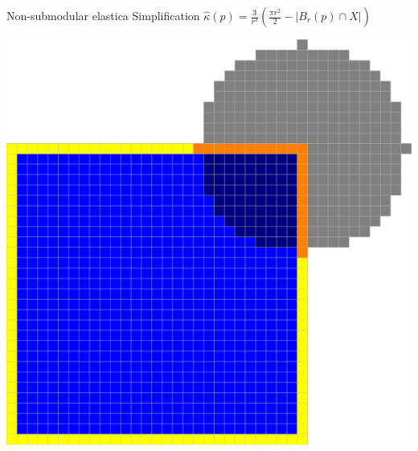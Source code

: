 \begin{frame}
{Non-submodular elastica}
{Simplification}
\center
$\hat{\kappa}(p) = \frac{3}{r^3}\left( \frac{\pi r^2}{2} - | B_r(p) \cap X | \right )$
\begin{minipage}[t][0.5\textheight]{1\textwidth}
\center
\includegraphics[scale=0.1]{figures/non-submodular-elastica/before-opt.png}\hspace{2em}

\end{minipage}
\end{frame}
